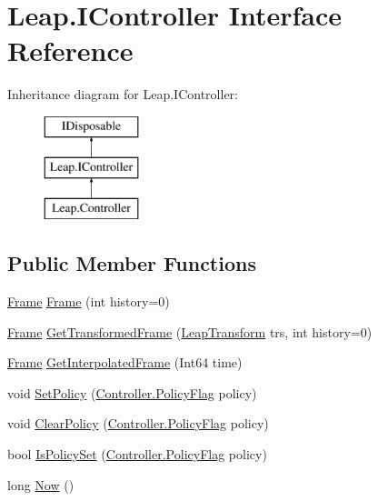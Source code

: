 \hypertarget{interface_leap_1_1_i_controller}{}\section{Leap.\+I\+Controller Interface Reference}
\label{interface_leap_1_1_i_controller}
Inheritance diagram for Leap.\+I\+Controller\+:\begin{figure}[H]
\begin{center}
\leavevmode
\includegraphics[height=3.000000cm]{interface_leap_1_1_i_controller}
\end{center}
\end{figure}
\subsection*{Public Member Functions}
\begin{DoxyCompactItemize}
\item 
\mbox{\hyperlink{class_leap_1_1_frame}{Frame}} \mbox{\hyperlink{interface_leap_1_1_i_controller_a0f8fe519944cc39eae5cf0d3caeaa33c}{Frame}} (int history=0)
\item 
\mbox{\hyperlink{class_leap_1_1_frame}{Frame}} \mbox{\hyperlink{interface_leap_1_1_i_controller_a10970bf31bdf9dfd46f0449a1759151d}{Get\+Transformed\+Frame}} (\mbox{\hyperlink{struct_leap_1_1_leap_transform}{Leap\+Transform}} trs, int history=0)
\item 
\mbox{\hyperlink{class_leap_1_1_frame}{Frame}} \mbox{\hyperlink{interface_leap_1_1_i_controller_a47758a602643bb7d6db92e024b334009}{Get\+Interpolated\+Frame}} (Int64 time)
\item 
void \mbox{\hyperlink{interface_leap_1_1_i_controller_a12a90db07fb494e152cc937569ec77f0}{Set\+Policy}} (\mbox{\hyperlink{class_leap_1_1_controller_a0bdb49fa94aa2da8b098c1ac296528d6}{Controller.\+Policy\+Flag}} policy)
\item 
void \mbox{\hyperlink{interface_leap_1_1_i_controller_a7aaaef3d250d3b9114a5836d5e470bb3}{Clear\+Policy}} (\mbox{\hyperlink{class_leap_1_1_controller_a0bdb49fa94aa2da8b098c1ac296528d6}{Controller.\+Policy\+Flag}} policy)
\item 
bool \mbox{\hyperlink{interface_leap_1_1_i_controller_abdb91a0a5278f41c91cb92e37854c27c}{Is\+Policy\+Set}} (\mbox{\hyperlink{class_leap_1_1_controller_a0bdb49fa94aa2da8b098c1ac296528d6}{Controller.\+Policy\+Flag}} policy)
\item 
long \mbox{\hyperlink{interface_leap_1_1_i_controller_a965ef8281ece6db686682378a71ce38c}{Now}} ()
\end{DoxyCompactItemize}
